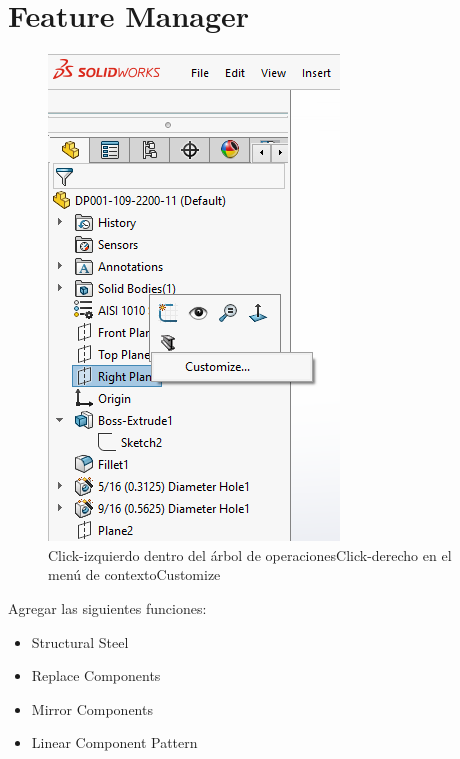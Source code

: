 \documentclass[12pt,letterpaper,final]{report}
\begin{document}
\section{Feature Manager}

\begin{figure}[H]
	\centering
	\includegraphics[width=0.85\linewidth, height=0.5\textheight,keepaspectratio]{Imagenes/solidworks_contextmenu_03}
	\caption{Click-izquierdo dentro del árbol de operaciones\textrightarrow Click-derecho en el menú de contexto\textrightarrow Customize}
	\label{fig:solidworkscontextmenu03}
\end{figure}

Agregar las siguientes funciones:

\begin{itemize}
	\item Structural Steel
	\item Replace Components
	\item Mirror Components
	\item Linear Component Pattern
\end{itemize}
\end{document}
